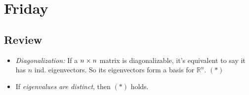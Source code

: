 

\section{Friday}
\subsection{Review}
\begin{itemize}
\item
\emph{Diagonalization: }If a $n\times n$ matrix is diagonalizable, it's equivalent to say it has $n$ ind. eigenvectors. So its eigenvectors form a basis for $\mathbb{R}^n$. $(*)$
\item
If \textit{eigenvalues are distinct}, then $(*)$ holds.
\end{itemize}
